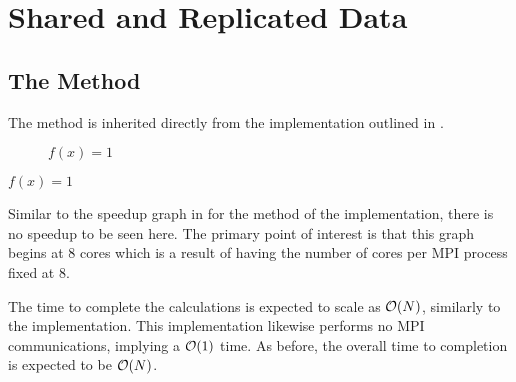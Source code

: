 \section{Shared and Replicated Data}


\subsection{The \individualoperation{} Method}

The \individualoperation{} method is inherited directly from
the implementation outlined in
.


%

%
%
\begin{figure}[!h]
    
    \caption{
        \vZeroSpeedupCaption
            {\sharedandreplicateddata{}}
            {\individualoperation{}}
            {$f(x) = 1$}
    }
    \label{fig:v1_shared_and_replicated_data_individual_operation_speedups}
\end{figure}


\vZeroSpeedupExplanation
    {}
    {\sharedandreplicateddata{}}
    {\individualoperation{}}
    {$f(x) = 1$}

Similar to the speedup graph in
for the \individualoperation{} method of the \replicateddata{}
implementation, there is no speedup to be seen here.
%
The primary point of interest is that this graph begins at 8 cores
which is a result of having the number of \openmp{} cores per
MPI process fixed at 8.

%
The time to complete the calculations is expected to scale as $\mathcal{O}{\left({ N }\right)}$,
similarly to the \replicateddata{} implementation.
%
This implementation likewise performs no MPI communications, implying a
$\mathcal{O}{\left({ 1 }\right)}$ time.
%
As before, the overall time to completion is expected to be $\mathcal{O}{\left({ N }\right)}$.

